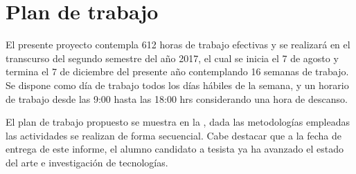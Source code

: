 \chapter{Plan de trabajo}
\label{ch:plan_trabajo}

El presente proyecto contempla 612 horas de trabajo efectivas y se realizará en el transcurso del segundo semestre del año 2017, el cual se inicia el 7 de agosto y termina el 7 de diciembre del presente año contemplando 16 semanas de trabajo. Se dispone como día de trabajo todos los días hábiles de la semana, y un horario de trabajo desde las 9:00 hasta las 18:00 hrs considerando una hora de descanso.

El plan de trabajo propuesto se muestra en la , dada las metodologías empleadas las actividades se realizan de forma secuencial. Cabe destacar que a la fecha de entrega de este informe, el alumno candidato a tesista ya ha avanzado el estado del arte e investigación de tecnologías.

\begin{table}[htb]
  \centering
    \label{tab:plan}
\end{table}